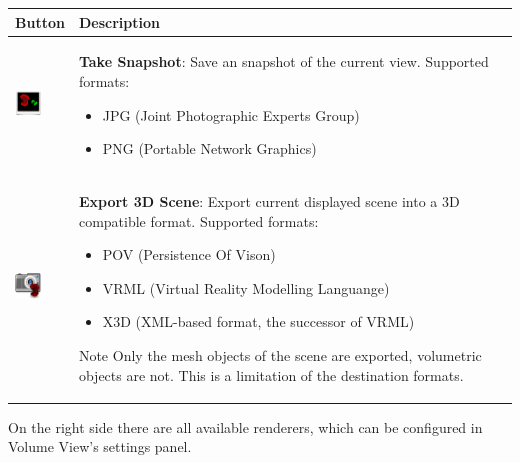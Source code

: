 \begin{tabular}{| m{1.3cm} | m{13.5cm} |}
\hline
\textbf{Button} & \textbf{Description}\\
\hline
\includegraphics[width=0.7cm]{../../frontend/rsc/snapshot_scene} & 
\textbf{Take Snapshot}: Save an snapshot of the current view. Supported formats:
\begin{itemize}
\item JPG (Joint Photographic Experts Group)
\item PNG (Portable Network Graphics)
\end{itemize}\\
\hline
\includegraphics[width=0.7cm]{../../frontend/rsc/export_scene} &
\textbf{Export 3D Scene}: Export current displayed scene into a 3D compatible format. Supported formats:
\begin{itemize}
\item POV (Persistence Of Vison)
\item VRML (Virtual Reality Modelling Languange)
\item X3D (XML-based format, the successor of VRML)
\end{itemize}
\begin{bclogo}[couleur = yellow!33, logo=\bcattention]
{Note} Only the mesh objects of the scene are exported, volumetric objects are not. This is a limitation of the destination formats.
\end{bclogo}\\
\hline
\end{tabular}
\vspace{0.3cm}

On the right side there are all available renderers, which can be configured in
Volume View's settings panel.\\

